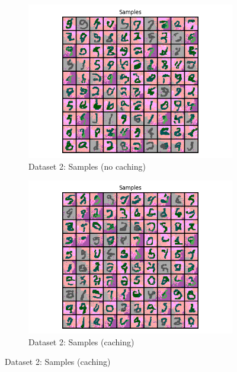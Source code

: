 \documentclass{article}
\begin{document}
\begin{enumerate}[(a)]
\begin{figure}[H]
    \centering
    \begin{subfigure}{0.45\textwidth}
        \centering
        \includegraphics[width=\textwidth]{figures/q3_c_no_cache_dset2_samples.png}
        \caption{Dataset 2: Samples (no caching)}
    \end{subfigure}
    \hspace{0.2in}
    \begin{subfigure}{0.45\textwidth}
        \centering
        \includegraphics[width=\textwidth]{figures/q3_c_with_cache_dset2_samples.png}
        \caption{Dataset 2: Samples (caching)}
    \end{subfigure}
\end{figure}
\end{enumerate}
\end{document}
